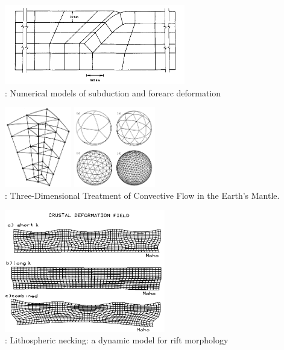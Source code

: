 \begin{center}
\includegraphics[height=3.5cm]{images/history/thar85}\\
{: Numerical models of subduction and forearc deformation \cite{thar85}}
\end{center}

\begin{center}
\begin{minipage}{0.48\textwidth}
\centering
\includegraphics[height=3.5cm]{images/history/baum85a}
\includegraphics[height=3.5cm]{images/history/baum85b}\\
{: Three-Dimensional Treatment of Convective Flow in the Earth's Mantle.
\cite{baum85}}
\end{minipage}\hfill
\begin{minipage}{0.45\textwidth}
\centering
\includegraphics[width=7cm]{images/history/zupf86}\\
{: Lithospheric necking: a dynamic model for rift morphology \cite{zupf86}}
\end{minipage}
\end{center}


